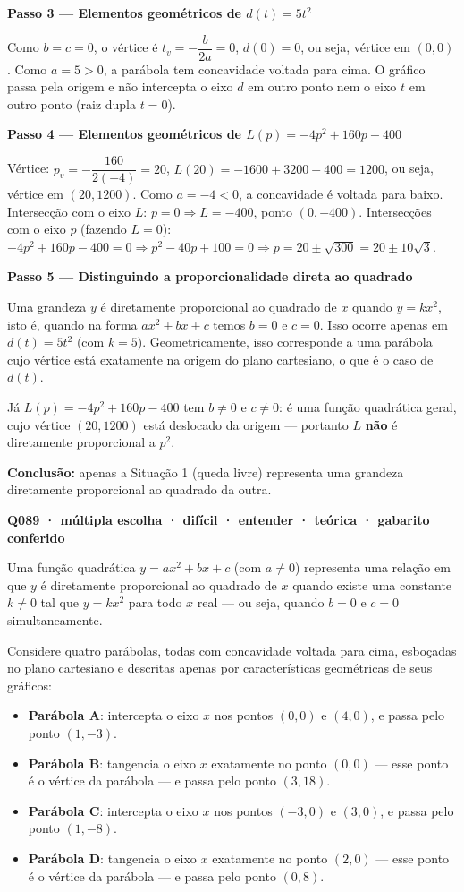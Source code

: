\documentclass[11pt,a4paper]{article}
\begin{document}
\textbf{Passo 3 — Elementos geométricos de $d(t)=5t^2$}

Como $b=c=0$, o vértice é $t_v=-\dfrac{b}{2a}=0$, $d(0)=0$, ou seja, vértice em $(0,0)$. Como $a=5>0$, a parábola tem concavidade voltada para cima. O gráfico passa pela origem e não intercepta o eixo $d$ em outro ponto nem o eixo $t$ em outro ponto (raiz dupla $t=0$).

\textbf{Passo 4 — Elementos geométricos de $L(p)=-4p^2+160p-400$}

Vértice: $p_v=-\dfrac{160}{2(-4)}=20$, $L(20)=-1600+3200-400=1200$, ou seja, vértice em $(20,1200)$. Como $a=-4<0$, a concavidade é voltada para baixo. Intersecção com o eixo $L$: $p=0 \Rightarrow L=-400$, ponto $(0,-400)$. Intersecções com o eixo $p$ (fazendo $L=0$): $-4p^2+160p-400=0 \Rightarrow p^2-40p+100=0 \Rightarrow p = 20\pm\sqrt{300} = 20\pm10\sqrt3$.

\textbf{Passo 5 — Distinguindo a proporcionalidade direta ao quadrado}

Uma grandeza $y$ é diretamente proporcional ao quadrado de $x$ quando $y=kx^2$, isto é, quando na forma $ax^2+bx+c$ temos $b=0$ e $c=0$. Isso ocorre apenas em $d(t)=5t^2$ (com $k=5$). Geometricamente, isso corresponde a uma parábola cujo vértice está exatamente na origem do plano cartesiano, o que é o caso de $d(t)$.

Já $L(p)=-4p^2+160p-400$ tem $b\neq 0$ e $c\neq 0$: é uma função quadrática geral, cujo vértice $(20,1200)$ está deslocado da origem — portanto $L$ \textbf{não} é diretamente proporcional a $p^2$.

\textbf{Conclusão:} apenas a Situação 1 (queda livre) representa uma grandeza diretamente proporcional ao quadrado da outra.

\bigskip\noindent\textbf{Q089 · múltipla escolha · difícil · entender · teórica · gabarito conferido}\par\nopagebreak
Uma função quadrática $y = ax^2 + bx + c$ (com $a \neq 0$) representa uma relação em que $y$ é diretamente proporcional ao quadrado de $x$ quando existe uma constante $k \neq 0$ tal que $y = kx^2$ para todo $x$ real — ou seja, quando $b = 0$ e $c = 0$ simultaneamente.

Considere quatro parábolas, todas com concavidade voltada para cima, esboçadas no plano cartesiano e descritas apenas por características geométricas de seus gráficos:

\begin{itemize}[nosep,leftmargin=*]
\item \textbf{Parábola A}: intercepta o eixo $x$ nos pontos $(0,0)$ e $(4,0)$, e passa pelo ponto $(1,-3)$.
\item \textbf{Parábola B}: tangencia o eixo $x$ exatamente no ponto $(0,0)$ — esse ponto é o vértice da parábola — e passa pelo ponto $(3,18)$.
\item \textbf{Parábola C}: intercepta o eixo $x$ nos pontos $(-3,0)$ e $(3,0)$, e passa pelo ponto $(1,-8)$.
\item \textbf{Parábola D}: tangencia o eixo $x$ exatamente no ponto $(2,0)$ — esse ponto é o vértice da parábola — e passa pelo ponto $(0,8)$.
\end{itemize}
\end{document}
